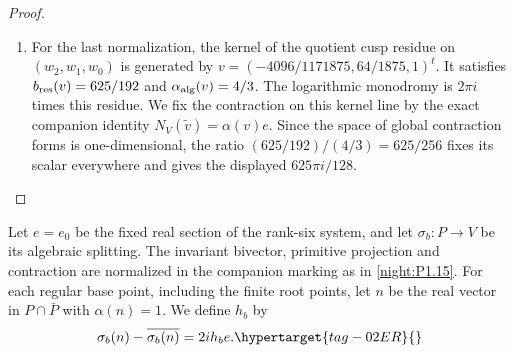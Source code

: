 \begin{proof}
\begin{enumerate}[label={$\langle1\rangle$\arabic*.}]
\item For the last normalization, the kernel of the quotient cusp residue
on $(w_2,w_1,w_0)$ is generated by
$v=(-4096/1171875,64/1875,1)^t$.
It satisfies $b_{\rm res}(v)=625/192$ and
$\alpha_{\rm alg}(v)=4/3$.
The logarithmic monodromy is $2\pi i$ times this residue.
We fix the contraction on this kernel line by the exact companion identity $N_V(\widetilde v)=\alpha(v)e$.
Since the space of global contraction forms is one-dimensional, the
ratio $(625/192)/(4/3)=625/256$ fixes its scalar everywhere and gives
the displayed $625\pi i/128$.

\end{enumerate}
\end{proof}

\begin{definition}
\hypertarget{tag-PV03}{}\label{def:hb}
Let $e=e_0$ be the fixed real section of the rank-six system,
and let $\sigma_b:P\to V$ be its algebraic splitting.
The invariant bivector, primitive projection and contraction are
normalized in the companion marking as in \cref{night:P1.15}.
For each regular base point, including the finite root points,
let $n$ be the real vector in $P\cap\bar P$ with $\alpha(n)=1$.
We define $h_b$ by
\begin{equation}
 \sigma_b(n)-\overline{\sigma_b(n)}=2i h_b e.
 \hypertarget{tag-02ER}{}\label{maps:eq:F.20}
\end{equation}
\end{definition}
